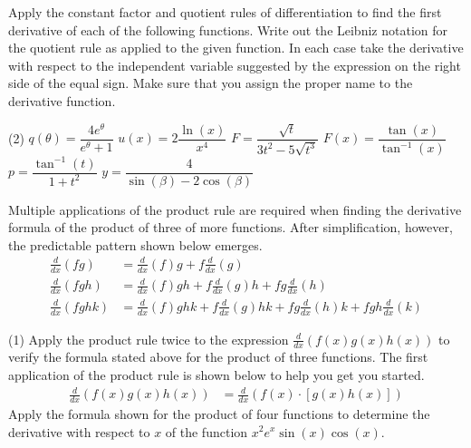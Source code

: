 \documentclass[10pt,oneside,]{book}
\theoremstyle{plain}
\theoremstyle{definition}
\numberwithin{equation}{section}
\newcommand{\fe}[2]{#1\mathopen{}\left(#2\right)\mathclose{}}
\newcommand{\lzoo}[2]{{\frac{d}{d#1}}{\left(#2\right)}}
\begin{document}
\par\smallskip\noindent
\hypertarget{exercisegroup-86}{\null}Apply the constant factor and quotient rules of differentiation to find the first derivative of each of the following functions.   Write out the Leibniz notation for the quotient rule as applied to the given function. In each case take the derivative with respect to the independent variable suggested by the expression on the right side of the equal sign.  Make sure that you assign the proper name to the derivative function.%
\par
\begin{exercisegroup}(2)
\exercise[13.]\hypertarget{exercise-413}{\null}\(\fe{q}{\theta}=\dfrac{4e^{\theta}}{e^\theta+1}\)%
\exercise[14.]\hypertarget{exercise-414}{\null}\(\fe{u}{x}=2\dfrac{\fe{\ln}{x}}{x^4}\)%
\exercise[15.]\hypertarget{exercise-415}{\null}\(F=\dfrac{\sqrt{t}}{3t^2-5\sqrt{t^3}}\)%
\exercise[16.]\hypertarget{exercise-416}{\null}\(\fe{F}{x}=\dfrac{\fe{\tan}{x}}{\fe{\tan^{-1}}{x}}\)%
\exercise[17.]\hypertarget{exercise-417}{\null}\(p=\dfrac{\fe{\tan^{-1}}{t}}{1+t^2}\)%
\exercise[18.]\hypertarget{exercise-418}{\null}\(y=\dfrac{4}{\fe{\sin}{\beta}-2\fe{\cos}{\beta}}\)%
\end{exercisegroup}
\par\smallskip\noindent
\hypertarget{exercisegroup-87}{\null}Multiple applications of the product rule are required when finding the derivative formula of the product of three of more functions.  After simplification, however, the predictable pattern shown below emerges.\begin{align*}
\lzoo{x}{fg}&=\lzoo{x}{f}g+f\lzoo{x}{g}\\
\lzoo{x}{fgh}&=\lzoo{x}{f}gh+f\lzoo{x}{g}h+fg\lzoo{x}{h}\\
\lzoo{x}{fghk}&=\lzoo{x}{f}ghk+f\lzoo{x}{g}hk+fg\lzoo{x}{h}k+fgh\lzoo{x}{k}
\end{align*}%
\par
\begin{exercisegroup}(1)
\exercise[19.]\hypertarget{exercise-419}{\null}Apply the product rule twice to the expression \(\lzoo{x}{\fe{f}{x}\fe{g}{x}\fe{h}{x}}\)  to verify the 
formula stated above for the product of three functions.  The first application of the product rule is shown below to help you get you started.\begin{align*}
\lzoo{x}{\fe{f}{x}\fe{g}{x}\fe{h}{x}}&=\lzoo{x}{\fe{f}{x}\cdot\left[\fe{g}{x}\fe{h}{x}\right]}
\end{align*}%
\exercise[20.]\hypertarget{exercise-420}{\null}Apply the formula shown for the product of four functions to determine the derivative with respect to \(x\) of the function \(x^2e^x\fe{\sin}{x}\fe{\cos}{x}\).%
\end{exercisegroup}
\end{document}
